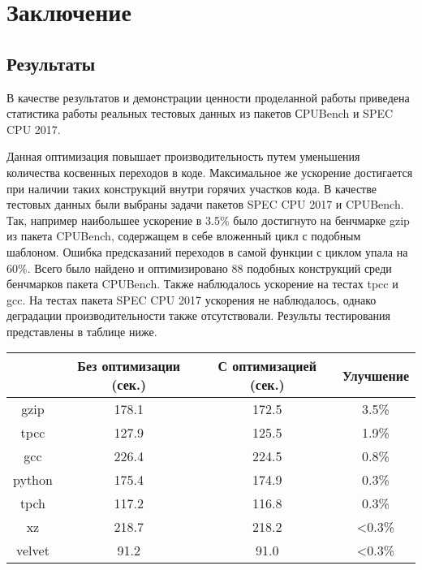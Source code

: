 \section{Заключение}
\label{sec:Chapter5} 


\subsection{Результаты}

В качестве результатов и демонстрации ценности проделанной работы приведена статистика работы реальных тестовых данных из пакетов СPUBench и SPEC CPU 2017. 

Данная оптимизация повышает производительность путем уменьшения количества косвенных переходов в коде. Максимальное же ускорение достигается при наличии таких конструкций внутри горячих участков кода. В качестве тестовых данных были выбраны задачи пакетов SPEC CPU 2017 и CPUBench. Так, например наибольшее ускорение в 3.5\% было достигнуто на бенчмарке gzip из пакета CPUBench, содержащем в себе вложенный цикл с подобным шаблоном. Ошибка предсказаний переходов в самой функции с циклом упала на 60\%. Всего было найдено и оптимизировано 88 подобных конструкций среди бенчмарков пакета CPUBench. Также наблюдалось ускорение на тестах tpcc и gcc. На тестах пакета SPEC CPU 2017 ускорения не наблюдалось, однако деградации производительности также отсутствовали. Результы тестирования представлены в таблице ниже.

\begin{table}[!htb]
    \centering
    \begin{tabular}{|c|c|c|c|}
        \hline
           & Без оптимизации (сек.)  & С оптимизацией (сек.)  & Улучшение  \\ \hline
        gzip    & 178.1  & 172.5  & 3.5\%  \\ \hline
        tpcc    & 127.9 & 125.5 & 1.9\% \\ \hline
        gcc     & 226.4 & 224.5 & 0.8\% \\ \hline
        python  & 175.4 & 174.9 & 0.3\% \\ \hline
        tpch    & 117.2 & 116.8 & 0.3\% \\ \hline
        xz      & 218.7 & 218.2 & <0.3\% \\ \hline
        velvet  & 91.2 & 91.0 & <0.3\% \\ \hline
    \end{tabular}
\end{table}


